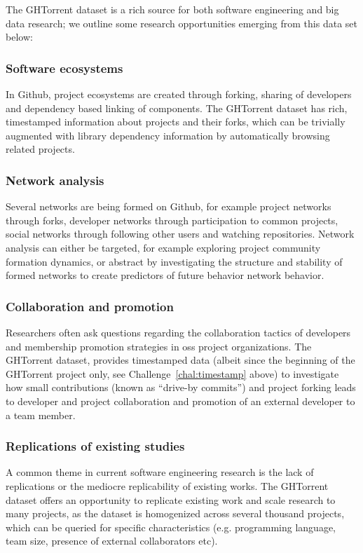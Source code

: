 \documentclass[conference]{IEEEtran}
\begin{document}
The GHTorrent dataset is a rich source for both software engineering and
big data research; we outline some research opportunities emerging from
this data set below:

\subsubsection{Software ecosystems} In Github, project ecosystems are created
through forking, sharing of developers and dependency based linking of
components. The GHTorrent dataset has rich, timestamped information about 
projects and their forks, which can be trivially augmented with library
dependency information by automatically browsing related projects.

\subsubsection{Network analysis} Several networks are being formed on
Github, for example project networks through forks, developer networks
through participation to common projects, social networks through following
other users and watching repositories. Network analysis can either
be targeted, for example exploring project community formation dynamics, or
abstract by investigating the structure and stability of formed networks to
create predictors of future behavior network behavior.

\subsubsection{Collaboration and promotion} Researchers often ask questions
regarding the collaboration tactics of developers and membership promotion
strategies in {\sc oss} project organizations.  The GHTorrent dataset,
provides timestamped data (albeit since the beginning of the GHTorrent
project only, see Challenge~\ref{chal:timestamp} above) to investigate
how small contributions (known as ``drive-by commits'') and project
forking leads to developer and project collaboration and promotion of an
external developer to a team member.

\subsubsection{Replications of existing studies} A common theme in current
software engineering research is the lack of replications or the
mediocre replicability of existing works. The GHTorrent dataset offers
an opportunity to replicate existing work and scale research to many
projects, as the dataset is homogenized across several thousand projects,
which can be queried for specific characteristics (e.g. programming language,
team size, presence of external collaborators etc).
\end{document}
